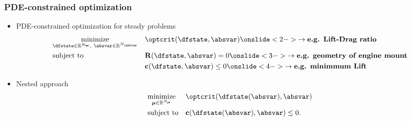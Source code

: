 \begin{frame}
  \frametitle{PDE-constrained optimization}

  \begin{itemize}
    \item PDE-constrained optimization for steady problems
      \begin{equation*}
        \begin{aligned}
          & \underset{\dfstate \in \Rbb^{N_\wbold},~\absvar \in \Rbb^{N_\absvar}}{\text{minimize}}
          & & \optcrit(\dfstate, \absvar) \onslide<2->{\rightarrow \textbf{e.g. Lift-Drag ratio}} \\
          & \text{subject to}
          & & \Rbold(\dfstate, \absvar) = 0 \onslide<3->{\rightarrow \textbf{e.g. geometry of engine mount}} \\
          & & & \cbold(\dfstate, \absvar) \leq 0 \onslide<4->{\rightarrow \textbf{e.g. minimmum Lift}}
        \end{aligned}
      \end{equation*}
    \item Nested approach
      \begin{equation*}
        \begin{aligned}
          & \underset{\mubold \in \Rbb^{N_\mubold}}{\text{minimize}}
          & & \optcrit(\dfstate(\absvar), \absvar) \\
          & \text{subject to}
          & & \cbold(\dfstate(\absvar), \absvar) \leq 0.
        \end{aligned}
      \end{equation*}
  \end{itemize}
  ~~\\
\end{frame}




